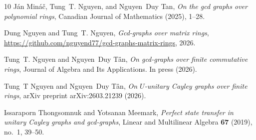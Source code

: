 \documentclass[12pt, a4paper]{amsart}
\theoremstyle{definition}
\numberwithin{equation}{section}
\begin{document}
\begin{thebibliography}{10}
J{\'a}n Min{\'a}{\v{c}}, Tung~T. Nguyen, and Nguyen~Duy Tan, \emph{On the gcd graphs over polynomial rings}, Canadian Journal of Mathematics (2025), 1–28.

Dung Nguyen and Tung~T. Nguyen, \emph{Gcd-graphs over matrix rings}, \url{https://github.com/nguyend77/gcd-graphs-matrix-rings}, 2026.

Tung~T. Nguyen and Nguyen~Duy T{\^a}n, \emph{On gcd-graphs over finite commutative rings}, Journal of Algebra and Its Applications. In press (2026).

Tung~T Nguyen and Nguyen~Duy T{\^a}n, \emph{On ${U}$-unitary {Cayley} graphs over finite rings}, arXiv preprint arXiv:2603.21239 (2026).

Issaraporn Thongsomnuk and Yotsanan Meemark, \emph{Perfect state transfer in unitary {C}ayley graphs and gcd-graphs}, Linear and Multilinear Algebra \textbf{67} (2019), no.~1, 39--50.

\end{thebibliography}

%
%
\end{document}
